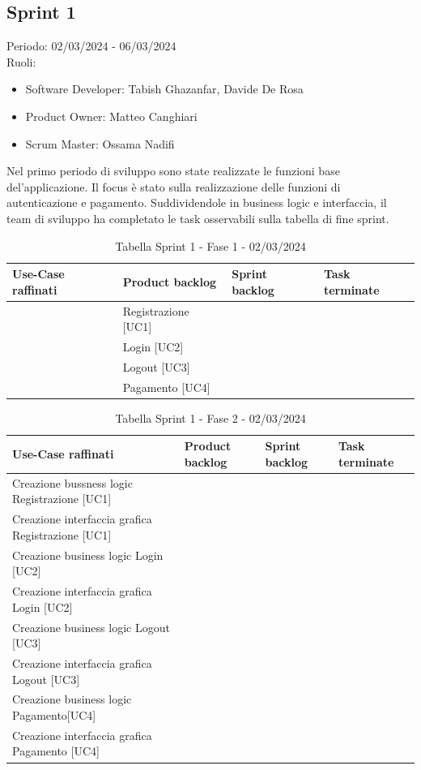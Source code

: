 \documentclass{article}
\begin{document}
\subsection{Sprint 1}
Periodo: 02/03/2024 - 06/03/2024\vspace*{7pt}\\
Ruoli:
\begin{itemize}[label = { }]
    \itemsep0em
    \item Software Developer: Tabish Ghazanfar, Davide De Rosa
    \item Product Owner: Matteo Canghiari
    \item Scrum Master: Ossama Nadifi
\end{itemize}
Nel primo periodo di sviluppo sono state realizzate le funzioni base del'applicazione. Il focus è stato sulla realizzazione delle funzioni di autenticazione e pagamento. Suddividendole in business logic e interfaccia, il team di sviluppo ha completato le task osservabili sulla tabella di fine sprint.

\begin{table}[h]
    \centering
    \begin{tabularx}{\textwidth}{|X|X|X|X|}
        \hline
        \bf Use-Case raffinati & \bf Product backlog & \bf Sprint backlog & \bf Task terminate \\
        \hline
        & Registrazione [UC1] & & \\
        \hline
        & Login [UC2] & & \\
        \hline
        & Logout [UC3] & & \\
        \hline
        & Pagamento [UC4] &  &  \\
        \hline
    \end{tabularx}
    \caption*{Tabella Sprint 1 - Fase 1 - 02/03/2024}
\end{table}

\begin{table}[h]
    \centering
    \begin{tabularx}{\textwidth}{|X|X|X|X|}
        \hline
        \bf Use-Case raffinati & \bf Product backlog & \bf Sprint backlog & \bf Task terminate \\
        \hline
        Creazione bussness logic Registrazione [UC1] & & & \\
        \hline
        Creazione interfaccia grafica Registrazione [UC1] & & & \\
        \hline
        Creazione business logic Login [UC2] & & & \\
        \hline
        Creazione interfaccia grafica Login [UC2] & &  &  \\
        \hline
        Creazione business logic Logout [UC3] & &  &  \\
        \hline
        Creazione interfaccia grafica Logout [UC3] & &  &  \\
        \hline
        Creazione business logic Pagamento[UC4] & &  &  \\
        \hline
        Creazione interfaccia grafica Pagamento [UC4] & &  &  \\
        \hline
    \end{tabularx}
    \caption*{Tabella Sprint 1 - Fase 2 - 02/03/2024}
\end{table}
\end{document}

